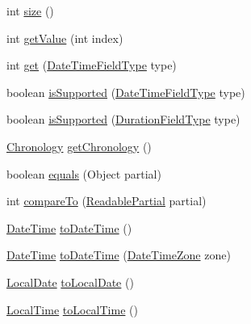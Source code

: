 \begin{DoxyCompactItemize}
\item 
int \hyperlink{classorg_1_1joda_1_1time_1_1_local_date_time_afd00893a75af43c5612132fb75fd5c24}{size} ()
\item 
int \hyperlink{classorg_1_1joda_1_1time_1_1_local_date_time_a612fc7e814325440c7b25e79ab894d87}{get\-Value} (int index)
\item 
int \hyperlink{classorg_1_1joda_1_1time_1_1_local_date_time_a8522a1f89ce780bbc37faaae7ba0629c}{get} (\hyperlink{classorg_1_1joda_1_1time_1_1_date_time_field_type}{Date\-Time\-Field\-Type} type)
\item 
boolean \hyperlink{classorg_1_1joda_1_1time_1_1_local_date_time_ad121b085afa90f974370d77a580217fe}{is\-Supported} (\hyperlink{classorg_1_1joda_1_1time_1_1_date_time_field_type}{Date\-Time\-Field\-Type} type)
\item 
boolean \hyperlink{classorg_1_1joda_1_1time_1_1_local_date_time_a4247a5c1bb4ffe27117f00714442f994}{is\-Supported} (\hyperlink{classorg_1_1joda_1_1time_1_1_duration_field_type}{Duration\-Field\-Type} type)
\item 
\hyperlink{classorg_1_1joda_1_1time_1_1_chronology}{Chronology} \hyperlink{classorg_1_1joda_1_1time_1_1_local_date_time_af1f05d9c5ada2d7f71c5dfd46a4917fa}{get\-Chronology} ()
\item 
boolean \hyperlink{classorg_1_1joda_1_1time_1_1_local_date_time_af1b4e2cab354fd7f6c1304e801502298}{equals} (Object partial)
\item 
int \hyperlink{classorg_1_1joda_1_1time_1_1_local_date_time_a007d251baae054db6b20f807511d1825}{compare\-To} (\hyperlink{interfaceorg_1_1joda_1_1time_1_1_readable_partial}{Readable\-Partial} partial)
\item 
\hyperlink{classorg_1_1joda_1_1time_1_1_date_time}{Date\-Time} \hyperlink{classorg_1_1joda_1_1time_1_1_local_date_time_a0a95b209be5cc08a726d3a39fac12c9d}{to\-Date\-Time} ()
\item 
\hyperlink{classorg_1_1joda_1_1time_1_1_date_time}{Date\-Time} \hyperlink{classorg_1_1joda_1_1time_1_1_local_date_time_a529cfd7a837efaa8850e3c11ac3d8cfe}{to\-Date\-Time} (\hyperlink{classorg_1_1joda_1_1time_1_1_date_time_zone}{Date\-Time\-Zone} zone)
\item 
\hyperlink{classorg_1_1joda_1_1time_1_1_local_date}{Local\-Date} \hyperlink{classorg_1_1joda_1_1time_1_1_local_date_time_af04d8aaba254d2e33c1eb2e757b5c9d5}{to\-Local\-Date} ()
\item 
\hyperlink{classorg_1_1joda_1_1time_1_1_local_time}{Local\-Time} \hyperlink{classorg_1_1joda_1_1time_1_1_local_date_time_a0127a866656df239b818cfbd4a1e9a37}{to\-Local\-Time} ()

\end{DoxyCompactItemize}
